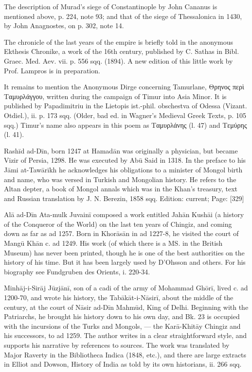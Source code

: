 The description of Murad\texthebrew{}’s siege of Constantinople by John Cananus is mentioned above, p. 224, note 93; and that of the siege of Thessalonica in 1430, by John Anagnostes, on p. 302, note 14.

The chronicle of the last years of the empire is briefly told in the anonymous Ekthesis Chronike, a work of the 16th century, published by C. Sathas in Bibl. Graec. Med. Aev. vii. p. 556 sqq. (1894). A new edition of this little work by Prof. Lampros is in preparation.

It remains to mention the Anonymous Dirge concerning Tamurlane, \textgreek{Θρηνος περ\texthebrew{ὶ} Ταμυρλάγγου}, written during the campaign of Timur into Asia Minor. It is published by Papadimitriu in the Lietopis ist.-phil. obschestva of Odessa (Vizant. Otdiel.), ii. p. 173 sqq. (Older, bad ed. in Wagner\texthebrew{}’s Medieval Greek Texts, p. 105 sqq.) Timur\texthebrew{}’s name also appears in this poem as \textgreek{Ταμυρλάνης} (l. 47) and \textgreek{Τεμύρης} (l. 41).

Rashīd ad-Dīn, born 1247 at Hamadān was originally a physician, but became Vizir of Persia, 1298. He was executed by Abū Said in 1318. In the preface to his Jāmi at-Tawārīkh he acknowledges his obligations to a minister of Mongol birth and name, who was versed in Turkish and Mongolian history. He refers to the Altan depter, a book of Mongol annals which was in the Khan\texthebrew{}’s treasury, text and Russian translation by J. N. Berezin, 1858 sqq.
Edition: current; Page: [329]

Alā ad-Dīn Ata-mulk Juvainī composed a work entitled Jahān Kushāi (a history of the Conqueror of the World) on the last ten years of Chingiz, and coming down as far as ad 1257. Born in Khorāsān in ad 1227-8, he visited the court of Mangū Khān c. ad 1249. His work (of which there is a MS. in the British Museum) has never been printed, though he is one of the best authorities on the history of his time. But it has been largely used by D\texthebrew{}’Ohsson and others. For his biography see Fundgruben des Orients, i. 220-34.

Minhāj-i-Sirāj Jūzjānī, son of a cadi of the army of Mohammad Ghōrī, lived c. ad 1200-70, and wrote his history, the Tabākāt-i-Nāsirī, about the middle of the century, at the court of Nāsir ad-Dīn Mahmūd, King of Delhi. Beginning with the Patriarchs, he brought his history down to his own day, and Bk. 23 is occupied with the incursions of the Turks and Mongols, \texthebrew{—} the Karā-Khitāy Chingiz and his successors, to ad 1259. The author writes in a clear straightforward style, and supports his narrative by references to sources. The work was translated by Major Raverty in the Bibliotheca Indica (1848, etc.), and there are large extracts in Elliot and Dowson, History of India as told by its own historians, ii. 266 sqq.

